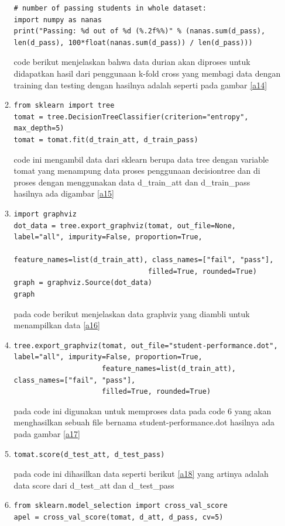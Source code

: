\begin{itemize}
\begin{enumerate}
\begin{verbatim}
# number of passing students in whole dataset:
import numpy as nanas
print("Passing: %d out of %d (%.2f%%)" % (nanas.sum(d_pass), len(d_pass), 100*float(nanas.sum(d_pass)) / len(d_pass)))

\end{verbatim}
\subitem
code berikut menjelaskan bahwa data durian akan diproses untuk didapatkan hasil dari penggunaan k-fold cross yang membagi data dengan training dan testing dengan hasilnya adalah seperti pada gambar \ref{a14}
\item 
\begin{verbatim}
from sklearn import tree
tomat = tree.DecisionTreeClassifier(criterion="entropy", max_depth=5)
tomat = tomat.fit(d_train_att, d_train_pass)

\end{verbatim}
\subitem
code ini mengambil data dari sklearn berupa data tree dengan variable tomat yang menampung data proses penggunaan decisiontree dan di proses dengan menggunakan data d\_train\_att dan d\_train\_pass hasilnya ada digambar \ref{a15}
\item
\begin{verbatim}
import graphviz
dot_data = tree.export_graphviz(tomat, out_file=None, label="all", impurity=False, proportion=True,
                                feature_names=list(d_train_att), class_names=["fail", "pass"], 
                                filled=True, rounded=True)
graph = graphviz.Source(dot_data)
graph
\end{verbatim}
\subitem
pada code berikut menjelaskan data graphviz yang diambli untuk menampilkan data \ref{a16}
\item 
\begin{verbatim}
tree.export_graphviz(tomat, out_file="student-performance.dot", label="all", impurity=False, proportion=True,
                     feature_names=list(d_train_att), class_names=["fail", "pass"], 
                     filled=True, rounded=True)
\end{verbatim}
\subitem
pada code ini digunakan untuk memproses data pada code 6 yang akan menghasilkan sebuah file bernama student-performance.dot hasilnya ada pada gambar \ref{a17}
\item 
\begin{verbatim}
tomat.score(d_test_att, d_test_pass)

\end{verbatim}
\subitem
pada code ini dihasilkan data seperti berikut \ref{a18} yang artinya adalah data score dari d\_test\_att dan d\_test\_pass 
\item 
\begin{verbatim}
from sklearn.model_selection import cross_val_score
apel = cross_val_score(tomat, d_att, d_pass, cv=5)


\end{verbatim}
\end{enumerate}
\end{itemize}
